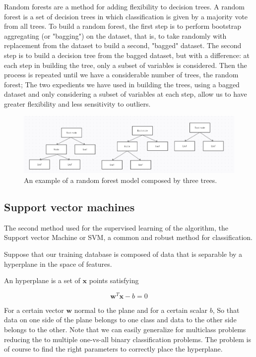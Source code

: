 \documentclass[a4paper]{report}
\begin{document}
Random forests are a method for adding flexibility to decision trees.
A random forest is a set of decision trees in which classification is given by a majority vote from all trees.
To build a random forest, the first step is to perform bootstrap aggregating (or "bagging") on the dataset, that is, to take randomly with replacement from the dataset to build a second, "bagged" dataset.
The second step is to build a decision tree from the bagged dataset, but with a difference:
at each step in building the tree, only a subset of variables is considered.
Then the process is repeated until we have a considerable number of trees, the random forest;
The two expedients we have used in building the trees, using a bagged dataset and only considering a subset of variables at each step, allow us to have greater flexibility and less sensitivity to outliers.

\begin{figure} [H]
\centering
\includegraphics [width=\textwidth ] {o/forest.png}
\caption{An example of a random forest model composed by three trees.}
\label{forest}
\end{figure}

\subsection{Support vector machines}

The second method used for the supervised learning of the algorithm, the Support vector Machine or SVM, a common and robust method for classification.

Suppose that our training database is composed of data that is separable by a hyperplane in the space of features.

An hyperplane is a set of $\textbf{x}$ points satisfying

\begin{equation}
    \textbf{w}^T\textbf{x} -b = 0
\end{equation}

For a certain vector $\textbf{w}$ normal to the plane and for a certain scalar $b$, So that data on one side of the plane belongs to one class and data to the other side belongs to the other.
Note that we can easily generalize for multiclass problems reducing the to multiple one-vs-all binary classification problems.
The problem is of course to find the right parameters to correctly place the hyperplane.
\end{document}
